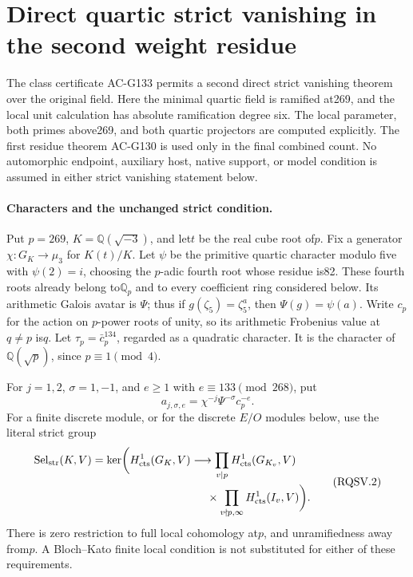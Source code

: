 \section{Direct quartic strict vanishing in the second weight residue}
\label{sec:cubic-ramified-quartic-strict-vanishing}

The class certificate AC-G133 permits a second direct strict
vanishing theorem over the original field.  Here the minimal quartic
field is ramified at269, and the local unit calculation has absolute
ramification degree six.  The local parameter, both primes above269,
and both quartic projectors are computed explicitly.  The first
residue theorem AC-G130 is used only in the final combined count.
No automorphic endpoint, auxiliary host, native support, or model
condition is assumed in either strict vanishing statement below.

\paragraph{Characters and the unchanged strict condition.}
Put $p=269$, $K=\mathbb Q(\sqrt{-3})$, and let$t$ be the real cube root of$p$.
Fix a generator $\chi:G_K\to\mu_3$ for $K(t)/K$.
Let $\psi$ be the primitive quartic character modulo five with
$\psi(2)=i$, choosing the $p$-adic fourth root whose residue is82.
These fourth roots already belong to$\mathbb Q_p$ and to every
coefficient ring considered below.
Its arithmetic Galois avatar is $\Psi$; thus if
$g(\zeta_5)=\zeta_5^a$, then $\Psi(g)=\psi(a)$.
Write $c_p$ for the action on $p$-power roots of unity, so its
arithmetic Frobenius value at $q\ne p$ is$q$.
Let $\tau_p=\bar c_p^{134}$, regarded as a quadratic character.
It is the character of $\mathbb Q(\sqrt p)$, since $p\equiv1\pmod4$.

For $j=1,2$, $\sigma=1,-1$, and $e\ge1$ with
$e\equiv133\pmod{268}$, put
\[
       a_{j,\sigma,e}=\chi^{-j}\Psi^{-\sigma}c_p^{-e}.
 \tag{RQSV.1}
\]
For a finite discrete module, or for the discrete $E/O$ modules
below, use the literal strict group
\[
 \begin{split}
 \operatorname{Sel}_{\mathrm{str}}(K,V)=\ker\biggl(
 H^1_{\mathrm{cts}}(G_K,V)&\longrightarrow
           \prod_{v\mid p}H^1_{\mathrm{cts}}(G_{K_v},V)\\
       &\hspace{5mm}\times
           \prod_{v\nmid p,\infty}H^1_{\mathrm{cts}}(I_v,V)
                                  \biggr).
 \end{split}
 \tag{RQSV.2}
\]
There is zero restriction to full local cohomology at$p$, and
unramifiedness away from$p$.  A Bloch--Kato finite local condition
is not substituted for either of these requirements.

